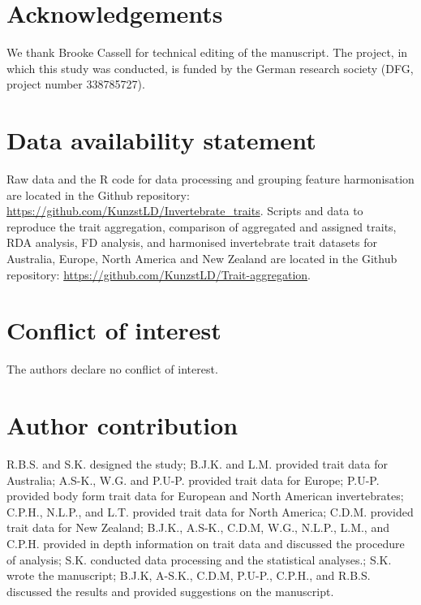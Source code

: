 \documentclass[12pt]{article}
\begin{document}

\section*{Acknowledgements}

We thank Brooke Cassell for technical editing of the manuscript. The project, in which this study was conducted, is funded by the German research society (DFG, project number 338785727).

\section*{Data availability statement}

Raw data and the R code for data processing and grouping feature harmonisation are located in the Github repository: \url{https://github.com/KunzstLD/Invertebrate_traits}. Scripts and data to reproduce the trait aggregation, comparison of aggregated and assigned traits, RDA analysis, FD analysis, and harmonised invertebrate trait datasets for Australia, Europe, North America and New Zealand are located in the Github repository: \url{https://github.com/KunzstLD/Trait-aggregation}.

\section*{Conflict of interest}

The authors declare no conflict of interest.

\section*{Author contribution}
R.B.S. and S.K. designed the study; B.J.K. and L.M. provided trait data for Australia; A.S-K., W.G. and P.U-P. provided trait data for Europe; P.U-P. provided body form trait data for European and North American invertebrates; C.P.H., N.L.P., and L.T. provided trait data for North America; C.D.M. provided trait data for New Zealand; B.J.K., A.S-K., C.D.M, W.G., N.L.P., L.M., and C.P.H. provided in depth information on trait data and discussed the procedure of analysis; S.K. conducted data processing and the statistical analyses.; S.K. wrote the manuscript; B.J.K, A-S.K., C.D.M, P.U-P., C.P.H., and R.B.S. discussed the results and provided suggestions on the manuscript.

\newpage
\end{document}

